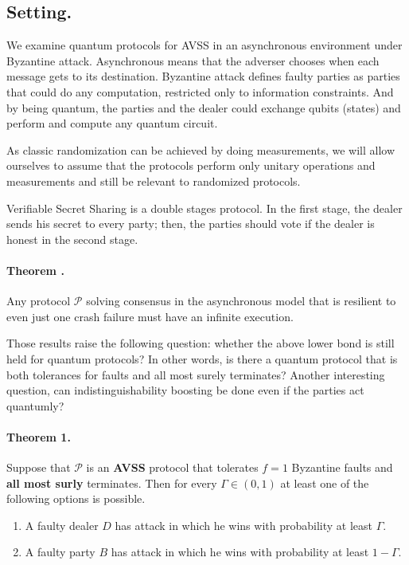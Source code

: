 \documentclass{article}
\begin{document}
\begin{multicols*}{2}


\section{Setting.}
We examine quantum protocols for AVSS in an asynchronous environment under Byzantine attack.  Asynchronous means that the adverser chooses when each message gets to its destination. Byzantine attack defines faulty parties as parties that could do any computation, restricted only to information constraints. And by being quantum, the parties and the dealer could exchange qubits (states) and perform and compute any quantum circuit.         

As classic randomization can be achieved by doing measurements, we will allow ourselves to assume that the protocols perform only unitary operations and measurements and still be relevant to randomized protocols.

Verifiable Secret Sharing is a double stages protocol. In the first stage, the dealer sends his secret to every party; then, the parties should vote if the dealer is honest in the second stage.  

\paragraph{Theorem \cite{FLP85}.} Any protocol \(\mathcal{P}\) solving consensus in the asynchronous model that is resilient to even just one crash failure must have an infinite execution. 

 \cite{DBLP:conf/podc/AbrahamDS20}

Those results raise the following question:  whether the above lower bond is still held for quantum protocols?  In other words, is there a quantum protocol that is both tolerances for faults and all most surely terminates? Another interesting question, can indistinguishability boosting be done even if the parties act quantumly? 


\paragraph{Theorem 1.} Suppose that \( \mathcal{P} \) is an \textbf{AVSS} protocol that tolerates \(f = 1\) Byzantine faults and \textbf{all most surly} terminates. Then for every \( \Gamma \in \left(0, 1\right)\) at least one of the following options is possible.
\begin{enumerate}
    \item A faulty dealer \(D\) has attack in which he wins with probability at least \( \Gamma \).
    \item A faulty party \(B\) has attack in which he wins with probability at least \( 1 - \Gamma \).
\end{enumerate}


\end{multicols*}
\end{document}
